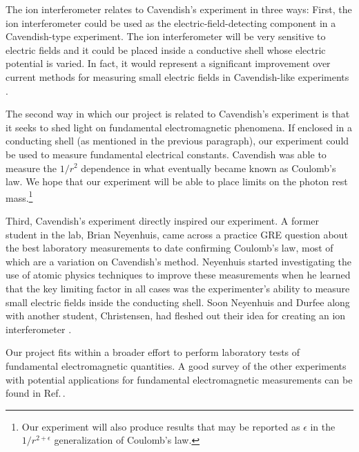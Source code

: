 The ion interferometer relates to Cavendish's experiment in three ways: First, the ion interferometer could be used as the electric-field-detecting component in a Cavendish-type experiment. The ion interferometer will be very sensitive to electric fields and it could be placed inside a conductive shell whose electric potential is varied. In fact, it would represent a significant improvement over current methods for measuring small electric fields in Cavendish-like experiments \cite{NSFprop}. 

The second way in which our project is related to Cavendish's experiment is that it seeks to shed light on fundamental electromagnetic phenomena. If enclosed in a conducting shell (as mentioned in the previous paragraph), our experiment could be used to measure fundamental electrical constants. Cavendish was able to measure the $1/r^2$ dependence in what eventually became known as Coulomb's law. We hope that our experiment will be able to place limits on the photon rest mass.\footnote{Our experiment will also produce results that may be reported as $\epsilon$ in the $1/r^{2+\epsilon}$ generalization of Coulomb's law.}

Third, Cavendish's experiment directly inspired our experiment.
A former student in the lab, Brian Neyenhuis, came across a practice GRE question%
about the best laboratory measurements to date confirming Coulomb's law, most of which are a variation on Cavendish's method. Neyenhuis started investigating the use of atomic physics techniques to improve these measurements when he learned that the key limiting factor in all cases was the experimenter's ability to measure small electric fields inside the conducting shell. Soon Neyenhuis and Durfee along with another student, Christensen, had fleshed out their idea for creating an ion interferometer \cite{christensen_arxiv_calcs} \cite{NeyenhuisIon}.  

Our project fits within a broader effort to perform laboratory tests of fundamental electromagnetic quantities. A good survey of the other experiments with potential applications for fundamental electromagnetic measurements can be found in Ref.\,\cite{PhotonMassSurvey}. 

